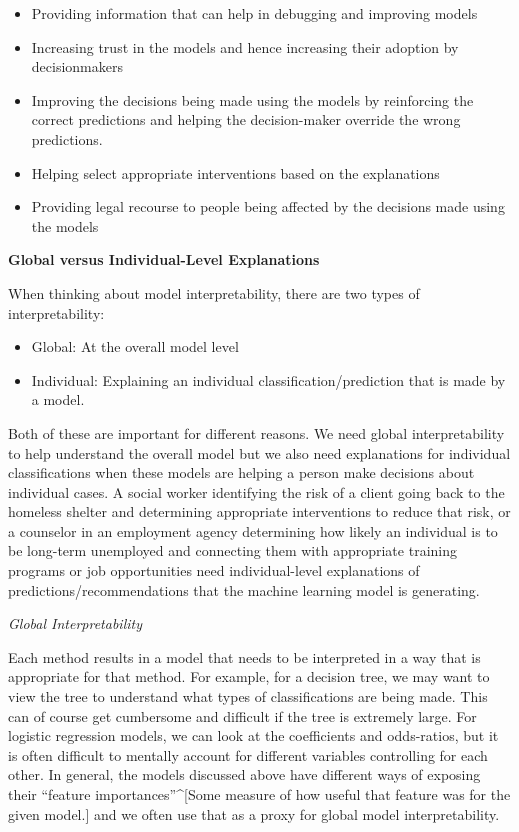 \documentclass[]{krantz}
\providecommand{\tightlist}{%
  \setlength{\itemsep}{0pt}\setlength{\parskip}{0pt}}
\begin{document}
\begin{itemize}
\tightlist
\item
  Providing information that can help in debugging and improving models
\item
  Increasing trust in the models and hence increasing their adoption by
  decisionmakers
\item
  Improving the decisions being made using the models by reinforcing the
  correct predictions and helping the decision-maker override the wrong
  predictions.
\item
  Helping select appropriate interventions based on the explanations
\item
  Providing legal recourse to people being affected by the decisions
  made using the models
\end{itemize}

\textbf{Global versus Individual-Level Explanations}

When thinking about model interpretability, there are two types of
interpretability:

\begin{itemize}
\tightlist
\item
  Global: At the overall model level
\item
  Individual: Explaining an individual classification/prediction that is
  made by a model.
\end{itemize}

Both of these are important for different reasons. We need global
interpretability to help understand the overall model but we also need
explanations for individual classifications when these models are
helping a person make decisions about individual cases. A social worker
identifying the risk of a client going back to the homeless shelter and
determining appropriate interventions to reduce that risk, or a
counselor in an employment agency determining how likely an individual
is to be long-term unemployed and connecting them with appropriate
training programs or job opportunities need individual-level
explanations of predictions/recommendations that the machine learning
model is generating.

\emph{Global Interpretability}

Each method results in a model that needs to be interpreted in a way
that is appropriate for that method. For example, for a decision tree,
we may want to view the tree to understand what types of classifications
are being made. This can of course get cumbersome and difficult if the
tree is extremely large. For logistic regression models, we can look at
the coefficients and odds-ratios, but it is often difficult to mentally
account for different variables controlling for each other. In general,
the models discussed above have different ways of exposing their
``feature importances''\^{}{[}Some measure of how useful that feature
was for the given model.{]} and we often use that as a proxy for global
model interpretability.
\end{document}

